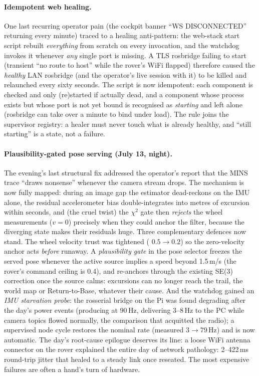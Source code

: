 \paragraph{Idempotent web healing.} One last recurring operator pain
(the cockpit banner ``WS DISCONNECTED'' returning every minute) traced to
a healing anti-pattern: the web-stack start script rebuilt \emph{everything}
from scratch on every invocation, and the watchdog invokes it whenever
\emph{any} single port is missing. A TLS rosbridge failing to start
(transient ``no route to host'' while the rover's WiFi flapped) therefore
caused the \emph{healthy} LAN rosbridge (and the operator's live session
with it) to be killed and relaunched every sixty seconds. The script is
now idempotent: each component is checked and only (re)started if actually
dead, and a component whose process exists but whose port is not yet bound
is recognised as \emph{starting} and left alone (rosbridge can take over a
minute to bind under load). The rule joins the supervisor registry: a healer
must never touch what is already healthy, and ``still starting'' is a state,
not a failure.

\paragraph{Plausibility-gated pose serving (July 13, night).} The evening's
last structural fix addressed the operator's report that the MINS trace
``draws nonsense'' whenever the camera stream drops. The mechanism is now
fully mapped: during an image gap the estimator dead-reckons on the IMU
alone, the residual accelerometer bias double-integrates into metres of
excursion within seconds, and (the cruel twist) the $\chi^2$ gate then
\emph{rejects} the wheel measurements ($v = 0$) precisely when they could
anchor the filter, because the diverging state makes their residuals huge.
Three complementary defences now stand. The wheel velocity trust was
tightened ( $0.5 \rightarrow 0.2$) so the zero-velocity
anchor acts \emph{before} runaway. A \emph{plausibility gate} in the pose
selector freezes the served pose whenever the active source implies a speed
beyond 1.5\,m/s (the rover's command ceiling is 0.4), and re-anchors
through the existing SE(3) correction once the source calms: excursions
can no longer reach the trail, the world map or Return-to-Base, whatever
their cause. And the watchdog gained an \emph{IMU starvation probe}: the
rosserial bridge on the Pi was found degrading after the day's power events
(producing at 90\,Hz, delivering 3--8\,Hz to the PC while camera topics
flowed normally, the comparison that acquitted the radio); a supervised
node cycle restores the nominal rate (measured $3 \rightarrow 79$\,Hz) and
is now automatic. The day's root-cause epilogue deserves its line: a loose
WiFi antenna connector on the rover explained the entire day of network
pathology: 2--422\,ms round-trip jitter that healed to a steady link once
reseated. The most expensive failures are often a hand's turn of hardware.

